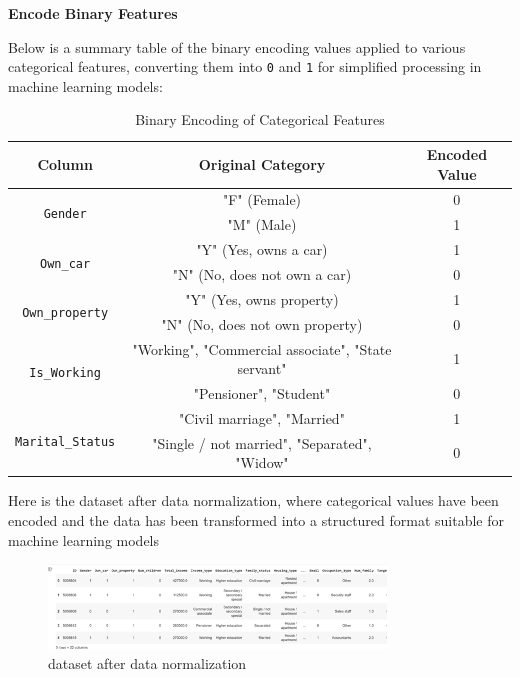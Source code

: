 \documentclass[12pt]{report}
\begin{document}
    {\bfseries Encode Binary Features}

    Below is a summary table of the binary encoding values applied to various categorical features, converting them into \texttt{0} and \texttt{1} for simplified processing in machine learning models:

    \begin{table}[h!]
        \centering
        \caption{Binary Encoding of Categorical Features}
        \begin{tabular}{|c|c|c|}
            \hline
            \textbf{Column} & \textbf{Original Category} & \textbf{Encoded Value} \\ \hline
            \multirow{2}{*}{\texttt{Gender}} & "F" (Female) & 0 \\
            & "M" (Male) & 1 \\ \hline
            \multirow{2}{*}{\texttt{Own\_car}} & "Y" (Yes, owns a car) & 1 \\
            & "N" (No, does not own a car) & 0 \\ \hline
            \multirow{2}{*}{\texttt{Own\_property}} & "Y" (Yes, owns property) & 1 \\
            & "N" (No, does not own property) & 0 \\ \hline
            \multirow{2}{*}{\texttt{Is\_Working}} & "Working", "Commercial associate", "State servant" & 1 \\
            & "Pensioner", "Student" & 0 \\ \hline
            \multirow{2}{*}{\texttt{Marital\_Status}} & "Civil marriage", "Married" & 1 \\
            & "Single / not married", "Separated", "Widow" & 0 \\ \hline
        \end{tabular}
    \end{table}

    Here is the dataset after data normalization, where categorical values have been encoded and the data has been transformed into a structured format suitable for machine learning models

    \begin{figure}[h!]
        \centering
        \includegraphics[width=0.8\textwidth]{resources/pic/dataset after data normalization.png}
        \caption{dataset after data normalization}
        \label{dataset after data normalization}
    \end{figure}
\end{document}
